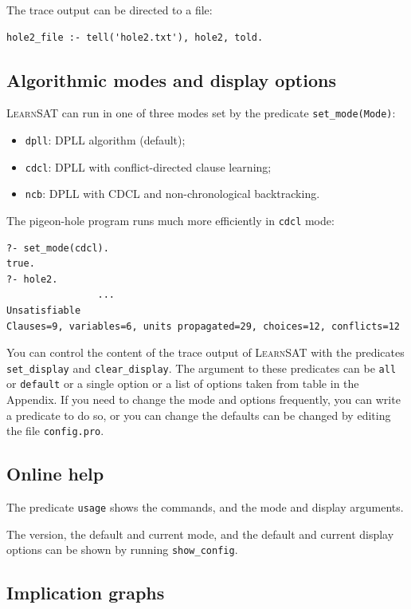 \documentclass[11pt]{article}
\newcommand*{\p}[1]{\textup{\texttt{#1}}}
\newcommand*{\ls}{\textsc{LearnSAT}}
\begin{document}
The trace output can be directed to a file:

\begin{verbatim}
hole2_file :- tell('hole2.txt'), hole2, told.
\end{verbatim}

\subsection{Algorithmic modes and display options}

\ls{} can run in one of three modes set by the predicate \p{set\_mode(Mode)}:
\begin{itemize}
\item \p{dpll}: DPLL algorithm (default);
\item \p{cdcl}: DPLL with conflict-directed clause learning;
\item \p{ncb}:  DPLL with CDCL and non-chronological backtracking.
\end{itemize}

The pigeon-hole program runs much more efficiently in \p{cdcl} mode:
\begin{verbatim}
?- set_mode(cdcl).
true.
?- hole2.
                ...
Unsatisfiable
Clauses=9, variables=6, units propagated=29, choices=12, conflicts=12
\end{verbatim}

You can control the content of the trace output of \ls{} with the
predicates \p{set\_display} and \p{clear\_display}. The argument to
these predicates can be \p{all} or \p{default} or a single option or a
list of options taken from table in the Appendix. If you need to change
the mode and options frequently, you can write a predicate to do so, or
you can change the defaults can be changed by editing the file
\p{config.pro}.

\subsection{Online help}

The predicate \p{usage} shows the commands, and the mode and display
arguments.

The version, the default and current mode, and the default and current
display options can be shown by running \p{show\_config}.

\subsection{Implication graphs}
\end{document}
